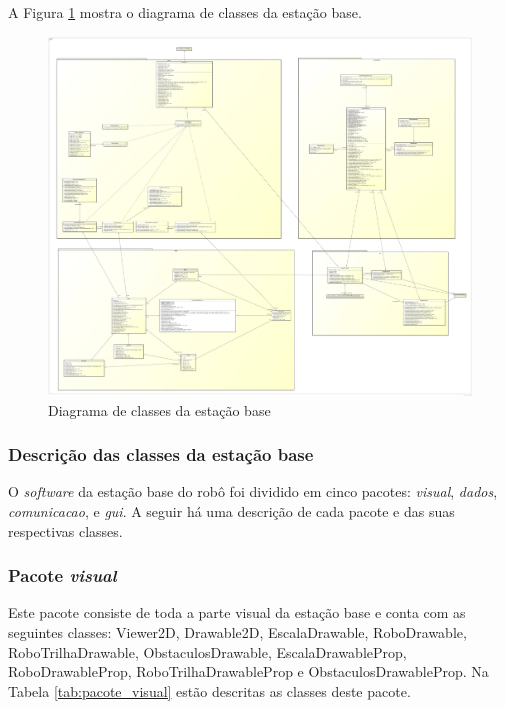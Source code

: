 A Figura \ref{fig:diagrama_classes_estacao_base} mostra o diagrama de classes da estação base.
\begin{figure}[H]
  \centering
  \includegraphics[width=\textwidth]{./figuras/estacaoBase/class_estacaoBase.jpg}
  \caption{Diagrama de classes da estação base}
  \label{fig:diagrama_classes_estacao_base}
\end{figure}

\subsubsection{Descrição das classes da estação base}
O \textit{software} da estação base do robô foi dividido em cinco pacotes:  \textit{visual}, \textit{dados}, \textit{comunicacao}, e \textit{gui}. A seguir há uma descrição de cada pacote e das suas respectivas classes.


\subsubsection{Pacote \textit{visual}}

Este pacote consiste de toda a parte visual da estação base e conta com as seguintes classes: Viewer2D, Drawable2D, EscalaDrawable, RoboDrawable, RoboTrilhaDrawable, ObstaculosDrawable, EscalaDrawableProp, RoboDrawableProp, RoboTrilhaDrawableProp e ObstaculosDrawableProp. Na Tabela \ref{tab:pacote_visual} estão descritas as classes deste pacote.


